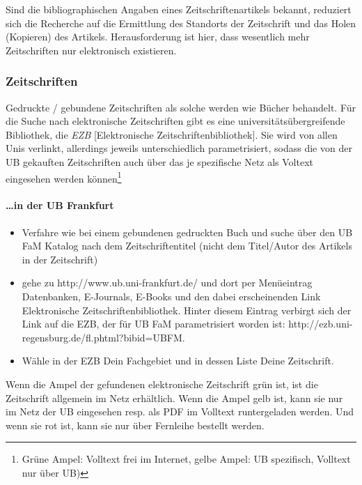 \documentclass[DIV=calc,BCOR=5mm,11pt,headings=small,oneside,abstract=false, toc=bib]{scrartcl}
\begin{document}
Sind die bibliographischen Angaben eines Zeitschriftenartikels bekannt, \glqq
reduziert\grqq{} sich die Recherche auf die Ermittlung des Standorts der
Zeitschrift und das Holen (Kopieren) des Artikels. Herausforderung ist hier,
dass wesentlich mehr Zeitschriften nur elektronisch existieren.

\subsubsection{Zeitschriften}

Gedruckte / gebundene Zeitschriften als solche werden wie Bücher behandelt. Für
die Suche nach elektronische Zeitschriften gibt es eine
universitätsübergreifende Bibliothek, die \emph{EZB} [\glqq{}Elektronische
Zeitschriftenbibliothek\grqq{}]. Sie wird von allen Unis verlinkt, allerdings
jeweils unterschiedlich parametrisiert, sodass die von der UB gekauften
Zeitschriften auch über das je spezifische Netz als Voltext eingesehen werden
können\footnote{Grüne Ampel: Volltext frei im Internet, gelbe Ampel: UB
spezifisch, Volltext nur über UB)}
\paragraph{\ldots in der UB Frankfurt}
\begin{itemize}
  \item Verfahre wie bei einem gebundenen gedruckten Buch und suche über den UB
  FaM Katalog nach dem Zeitschriftentitel (nicht dem Titel/Autor des Artikels
  in der Zeitschrift)
  \item  gehe zu {\ttfamily http://www.ub.uni-frankfurt.de/} und dort per
  Menüeintrag \glqq{}Datenbanken, E-Journals, E-Books\grqq{} und den dabei
  erscheinenden Link \glqq{}Elektronische Zeitschriftenbibliothek\grqq{}. Hinter
  diesem Eintrag verbirgt sich der Link auf die EZB, der für UB FaM
  parametrisiert worden ist: {\ttfamily
  http://ezb.uni-regensburg.de/fl.phtml?bibid=UBFM}.
  \item Wähle in der EZB Dein Fachgebiet und in dessen Liste Deine
  Zeitschrift.
\end{itemize}

Wenn die Ampel der gefundenen elektronische Zeitschrift grün ist, ist die
Zeitschrift allgemein im Netz erhältlich. Wenn die Ampel gelb ist, kann sie nur
im Netz der UB eingesehen resp. als PDF im Volltext runtergeladen werden. Und
wenn sie rot ist, kann sie nur über Fernleihe bestellt werden.
  
\end{document}
